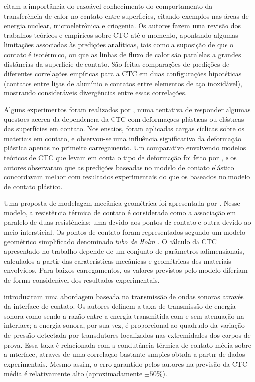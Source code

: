 \cite{artigo_snaith} citam a importância do razoável conhecimento do comportamento da transferência de calor no contato entre superfícies, citando
exemplos nas áreas de energia nuclear, microeletrônica e criogenia. Os autores fazem uma revisão dos trabalhos teóricos e empíricos sobre CTC
até o momento, apontando algumas limitações associadas às predições analíticas, tais como a suposição de que o contato é isotérmico, ou que as linhas de fluxo
de calor são paralelas a grandes distâncias da superficie de contato. São feitas comparações de predições de diferentes correlações empíricas
para a CTC em duas configurações hipotéticas (contatos entre ligas de alumínio e contatos entre elementos de aço inoxidável), mostrando
consideráveis divergências entre essas correlações.

Alguns experimentos foram realizados por \cite{artigo_williamson}, numa tentativa de responder algumas questões acerca da dependência da CTC com
deformações plásticas ou elásticas das superfícies em contato. Nos ensaios, foram aplicadas cargas cíclicas sobre os materiais em contato, e observou-se
uma influência significativa da deformação plástica apenas no primeiro carregamento. Um comparativo envolvendo modelos teóricos de CTC que levam em conta
o tipo de deformação foi feito por \cite{artigo_mcwaid}, e os autores observaram que as predições baseadas
no modelo de contato elástico concordavam melhor com resultados experimentais do que os baseados no modelo de contato plástico. 

Uma proposta de modelagem mecânica-geométrica foi apresentada por \cite{artigo_salgon}. Nesse modelo, a resistência térmica de contato é considerada
como a associação em paralelo de duas resistências: uma devido aos pontos de contato e outra devido ao meio intersticial. Os pontos de contato foram
representados segundo um modelo geométrico simplificado denominado \textit{tubo de Holm} \citep{livro_holm}. O cálculo da CTC apresentado no trabalho
depende de um conjunto de parâmetros adimensionais, calculados a partir das caraterísticas mecânicas e geométricas dos materiais envolvidos. Para baixos carregamentos,
os valores previstos pelo modelo diferiam de forma considerável dos resultados experimentais.

\cite{artigo_tomimura} introduziram uma abordagem baseada na transmissão de ondas sonoras através da interface de contato. Os autores definem a
taxa de transmissão de energia sonora como sendo a razão entre a energia transmitida com e sem atenuação na interface; a energia sonora, por sua
vez, é proporcional ao quadrado da variação de pressão detectada por transdutores localizados nas extremidades dos corpos de prova.
Essa taxa é relacionada com a condutância térmica de contato média sobre a interface, através de uma correlação bastante simples obtida a partir de dados
experimentais. Mesmo assim, o erro garantido pelos autores na previsão da CTC média é relativamente alto (aproximadamente $\pm 50 \%$).

